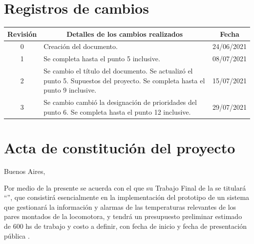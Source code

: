 \documentclass[
11pt, %
codirector, %
]{charter}
\begin{document}
\maketitle
\thispagestyle{empty}
\pagebreak


\thispagestyle{empty}
{\setlength{\parskip}{0pt}
\tableofcontents{}
}
\pagebreak


\section*{Registros de cambios}
\label{sec:registro}


\begin{table}[ht]
\label{tab:registro}
\centering
\begin{tabularx}{\linewidth}{@{}|c|X|c|@{}}
\hline
\rowcolor[HTML]{C0C0C0} 
Revisión & \multicolumn{1}{c|}{\cellcolor[HTML]{C0C0C0}Detalles de los cambios realizados} & Fecha      \\ \hline
0      & Creación del documento.                                 &24/06/2021\\ \hline
1      & Se completa hasta el punto 5 inclusive.                 & 08/07/2021 \\ \hline
2      & Se cambio el título del documento.\newline
		 Se actualizó el punto 5. Supuestos del proyecto.\newline  
		 Se completa hasta el punto 9 inclusive.      		      & 15/07/2021 \\ \hline
3     & Se cambio cambió la designación de prioridades del punto 6.\newline 
		 Se completa hasta el punto 12 inclusive.      		      & 29/07/2021 \\ \hline
\end{tabularx}
\end{table}

\pagebreak



\section*{Acta de constitución del proyecto}
\label{sec:acta}

\begin{flushright}
Buenos Aires, \fechaInicioName
\end{flushright}

\vspace{2cm}

Por medio de la presente se acuerda con el \authorname\hspace{1px} que su Trabajo Final de la \degreename\hspace{1px} se titulará ``\ttitle'', que consistirá esencialmente en la implementación del prototipo de un sistema que gestionará la información y alarmas de las temperaturas relevantes de los pares montados de la locomotora, y tendrá un presupuesto preliminar estimado de 600 hs de trabajo y costo a definir, con fecha de inicio \fechaInicioName\hspace{1px} y fecha de presentación pública \fechaFinalName.
\end{document}
